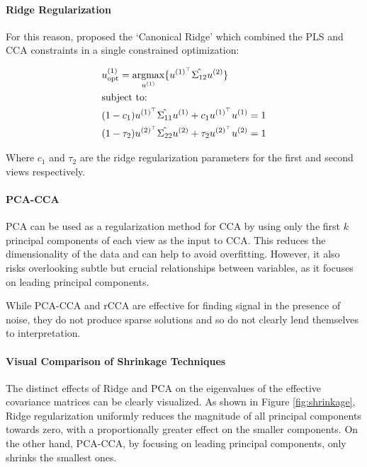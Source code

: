 \paragraph{Ridge Regularization}

For this reason, \cite{vinod1976canonical} proposed the `Canonical Ridge' which combined the PLS and CCA constraints in a single constrained optimization:

\begin{align}
     & u^{(1)}_{\text{opt}} = \underset{u^{(1)}}{\mathrm{argmax}} \{ u^{(1)^{\top}} \hat{\Sigma_{12}} u^{(2)} \} \\
     & \text{subject to:} \notag \\
     & (1 - c_1) u^{(1)^{\top}} \hat{\Sigma_{11}} u^{(1)} + c_1 u^{(1)^{\top}} u^{(1)} = 1 \notag \\
     & (1 - \tau_2) u^{(2)^{\top}} \hat{\Sigma_{22}} u^{(2)} + \tau_2 u^{(2)^{\top}} u^{(2)} = 1 \notag
\end{align}

Where $c_1$ and $\tau_2$ are the ridge regularization parameters for the first and second views respectively.

\paragraph{PCA-CCA} PCA can be used as a regularization method for CCA by using only the first \( k \) principal components of each view as the input to CCA.
This reduces the dimensionality of the data and can help to avoid overfitting.
However, it also risks overlooking subtle but crucial relationships between variables, as it focuses on leading principal components.

While PCA-CCA and rCCA are effective for finding signal in the presence of noise, they do not produce sparse
solutions and so do not clearly lend themselves to interpretation.

\paragraph{Visual Comparison of Shrinkage Techniques}

The distinct effects of Ridge and PCA on the eigenvalues of the effective covariance matrices can be clearly visualized.
As shown in Figure \ref{fig:shrinkage}, Ridge regularization uniformly reduces the magnitude of all principal components towards zero, with a proportionally greater effect on the smaller components.
On the other hand, PCA-CCA, by focusing on leading principal components, only shrinks the smallest ones.

